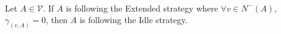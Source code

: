 \begin{lemma} \ \\
  \label{idleextended}
  Let $A \in \mathcal{V}$. If $A$ is following the Extended strategy where $\forall v \in N^{-}\left(A\right),$
  $\gamma_{\left(v, A\right)} = 0$, then $A$ is following the Idle strategy.
\end{lemma}
